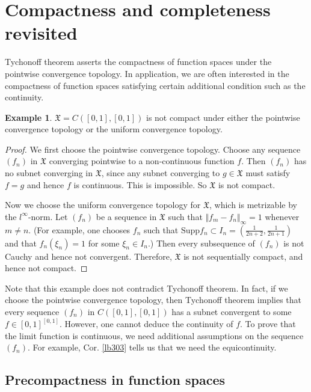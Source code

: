 \documentclass[12pt,b5paper,notitlepage]{article}
\theoremstyle{definition}
\newtheorem{eg}[df]{Example}
\theoremstyle{plain}
\newcommand{\fk}{\mathfrak}
\newcommand{\Supp}{\mathrm{Supp}}
\numberwithin{equation}{section}
\begin{document}
\section{Compactness and completeness revisited}





Tychonoff theorem asserts the compactness of function spaces under the pointwise convergence topology. In application, we are often interested in the compactness of function spaces satisfying certain additional condition such as the continuity. 

\begin{eg}\label{lb518}
$\fk X=C([0,1],[0,1])$ is not compact under either the pointwise convergence topology or the uniform convergence topology.
\end{eg}

\begin{proof}
We first choose the pointwise convergence topology. Choose any sequence $(f_n)$ in $\fk X$ converging pointwise to a non-continuous function $f$. Then $(f_n)$ has no subnet converging in $\fk X$, since any subnet converging to $g\in \fk X$ must satisfy $f=g$ and hence $f$ is continuous. This is impossible. So $\fk X$ is not compact.

Now we choose the uniform convergence topology for $\fk X$, which is metrizable by the $l^\infty$-norm. Let $(f_n)$ be a sequence in $\fk X$ such that $\Vert f_m-f_n\Vert_\infty=1$ whenever $m\neq n$. (For example, one chooses $f_n$ such that $\Supp f_n\subset I_n=(\frac 1{2n+2},\frac 1{2n+1})$ and that $f_n(\xi_n)=1$ for some $\xi_n\in I_n$.) Then every subsequence of $(f_n)$ is not Cauchy and hence not convergent. Therefore, $\fk X$ is not sequentially compact, and hence not compact.
\end{proof}



Note that this example does not contradict Tychonoff theorem. In fact, if we choose the pointwise convergence topology,  then Tychonoff theorem implies that every sequence $(f_n)$ in $C([0,1],[0,1])$ has a subnet convergent to some $f\in [0,1]^{[0,1]}$. However, one cannot deduce the continuity of $f$. To prove that the limit function is continuous, we need additional assumptions on the sequence $(f_n)$.  For example, Cor. \ref{lb303} tells us that we need the equicontinuity.




\subsection{Precompactness in function spaces}
\end{document}
